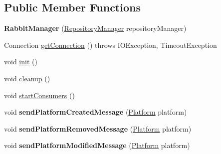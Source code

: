\subsection*{Public Member Functions}
\begin{DoxyCompactItemize}
\item 
{\bfseries Rabbit\+Manager} (\hyperlink{classeu_1_1h2020_1_1symbiote_1_1repository_1_1RepositoryManager}{Repository\+Manager} repository\+Manager)\hypertarget{classeu_1_1h2020_1_1symbiote_1_1messaging_1_1RabbitManager_ad05170cea6626e742a9b3ff5a359b192}{}\label{classeu_1_1h2020_1_1symbiote_1_1messaging_1_1RabbitManager_ad05170cea6626e742a9b3ff5a359b192}

\item 
Connection \hyperlink{classeu_1_1h2020_1_1symbiote_1_1messaging_1_1RabbitManager_ac6037e07ab7703c98c8a880a1ea5f5cd}{get\+Connection} ()  throws I\+O\+Exception, Timeout\+Exception 
\item 
void \hyperlink{classeu_1_1h2020_1_1symbiote_1_1messaging_1_1RabbitManager_ae6688b10d5858345271d21eda576036c}{init} ()
\item 
void \hyperlink{classeu_1_1h2020_1_1symbiote_1_1messaging_1_1RabbitManager_abf294e221b0bbfc0faa81d38fcec50cd}{cleanup} ()
\item 
void \hyperlink{classeu_1_1h2020_1_1symbiote_1_1messaging_1_1RabbitManager_ab6555364fdd7e95b41802ae24da7f30f}{start\+Consumers} ()
\item 
void {\bfseries send\+Platform\+Created\+Message} (\hyperlink{classeu_1_1h2020_1_1symbiote_1_1model_1_1Platform}{Platform} platform)\hypertarget{classeu_1_1h2020_1_1symbiote_1_1messaging_1_1RabbitManager_ad0733a08e8a207dac36c8ae6a86dfe7e}{}\label{classeu_1_1h2020_1_1symbiote_1_1messaging_1_1RabbitManager_ad0733a08e8a207dac36c8ae6a86dfe7e}

\item 
void {\bfseries send\+Platform\+Removed\+Message} (\hyperlink{classeu_1_1h2020_1_1symbiote_1_1model_1_1Platform}{Platform} platform)\hypertarget{classeu_1_1h2020_1_1symbiote_1_1messaging_1_1RabbitManager_af0a5271ea2607bc84b77f81d70e6dcd7}{}\label{classeu_1_1h2020_1_1symbiote_1_1messaging_1_1RabbitManager_af0a5271ea2607bc84b77f81d70e6dcd7}

\item 
void {\bfseries send\+Platform\+Modified\+Message} (\hyperlink{classeu_1_1h2020_1_1symbiote_1_1model_1_1Platform}{Platform} platform)\hypertarget{classeu_1_1h2020_1_1symbiote_1_1messaging_1_1RabbitManager_ac241cd7e1ec4b33aa0a907b86eecb354}{}\label{classeu_1_1h2020_1_1symbiote_1_1messaging_1_1RabbitManager_ac241cd7e1ec4b33aa0a907b86eecb354}


\end{DoxyCompactItemize}
